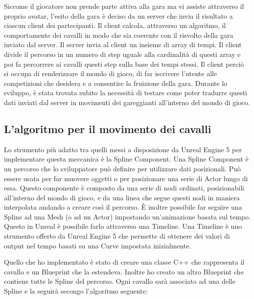     Siccome il giocatore non prende parte attiva alla gara ma vi assiste attraverso il proprio avatar, l'esito della gara è deciso da un server che invia il risultato a ciascun client dei partecipanti.
    Il client calcola, attraverso un algoritmo, il comportamente dei cavalli in modo che sia coerente con il risvolto della gara inviato dal server.
    Il server invia al client un insieme di array di tempi.
    Il client divide il percorso in un numero di step uguale alla cardinalità di questi array e poi fa percorrere ai cavalli questi step sulla base dei tempi stessi.
    Il client perciò si occupa di renderizzare il mondo di gioco, di far iscrivere l'utente alle competizioni che desidera e a consentire la fruizione della gara.
    Durante lo sviluppo, è stata trovata subito la necessità di testare come poter tradurre questi dati inviati dal server in movimenti dei gareggianti all'interno del mondo di gioco.

    \subsection{L'algoritmo per il movimento dei cavalli}

        Lo strumento più adatto tra quelli messi a disposizione da Unreal Engine 5 per implementare questa meccanica è la Spline Component.
        Una Spline Component è un percorso che lo sviluppatore può definire per utilizzare dati posizionali.
        Può essere usata per far muovere oggetti o per posizionare una serie di Actor lungo di essa.
        Questo componente è composto da una serie di nodi ordinati, posizionabili all'interno del mondo di gioco, e da una linea che segue questi nodi in maniera interpolata andando a creare così il percorso.
        È inoltre possibile far seguire una Spline ad una Mesh (o ad un Actor) impostando un'animazione basata sul tempo.
        Questo in Unreal è possibile farlo attraverso una Timeline.
        Una Timeline è uno strumento offerto da Unreal Engine 5 che permette di ottenere dei valori di output nel tempo basati su una Curve impostata inizialmente.

        Quello che ho implementato è stato di creare una classe C++ che rappresenta il cavallo e un Blueprint che la estendeva.
        Inoltre ho creato un altro Blueprint che contiene tutte le Spline del percorso.
        Ogni cavallo sarà associato ad una delle Spline e la seguirà secongo l'algoritmo seguente:

